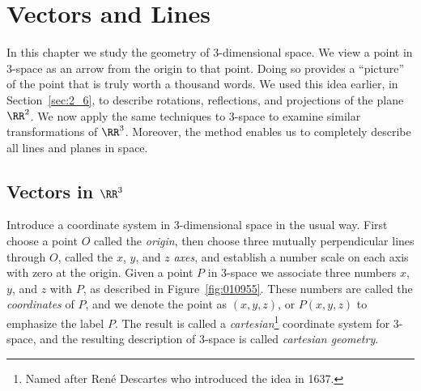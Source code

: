 \section{Vectors and Lines}
\label{sec:4_1}


In this chapter we study the geometry of 3-dimensional space. We view a 
point in 3-space as an arrow from the origin to that point. Doing so 
provides a ``picture'' of the point that is truly worth a thousand words. 
We used this idea earlier, in Section~\ref{sec:2_6}, to describe rotations, reflections, and projections of the plane $\RR^2$. We now apply the same techniques to 3-space to examine similar transformations of $\RR^3$. Moreover, the method enables us to completely describe all lines and planes in space.


\subsection*{Vectors in $\RR^3$}


Introduce a coordinate system in 3-dimensional space in the usual way. First choose a point $O$ called the \textit{origin}, then choose three mutually perpendicular lines through $O$, called the $x$, $y$, and $z$ \textit{axes}, and establish a number scale on each axis with zero at the origin. Given a point $P$ in $3$-space we associate three numbers $x$, $y$, and $z$ with $P$, as described in Figure~\ref{fig:010955}. These numbers are called the \textit{coordinates} of $P$, and we denote the point as $(x, y, z)$, or $P(x, y, z)$ to emphasize the label $P$. The result is called a \textit{cartesian}\footnote{Named after Ren\'{e} Descartes who introduced the idea in 1637.}
 coordinate system for 3-space, and the resulting description of 3-space is called \textit{cartesian geometry}.

